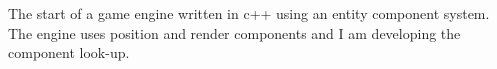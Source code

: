 

{The start of a game engine written in c++ using an entity component system. The engine uses position and render components and I am developing the component look-up.}